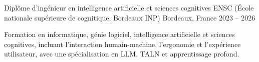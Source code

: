 
\begin{cventries}
  \cventry
    {Diplôme d’ingénieur en intelligence artificielle et sciences cognitives}
    {ENSC (École nationale supérieure de cognitique, Bordeaux INP)}
    {Bordeaux, France}
    {2023 -- 2026}
    {
      \begin{cvitems}
        \item {Formation en informatique, génie logiciel, intelligence artificielle et sciences cognitives, incluant l’interaction humain-machine, l’ergonomie et l’expérience utilisateur, avec une spécialisation en LLM, TALN et apprentissage profond.}
      \end{cvitems}
    }
\end{cventries}
